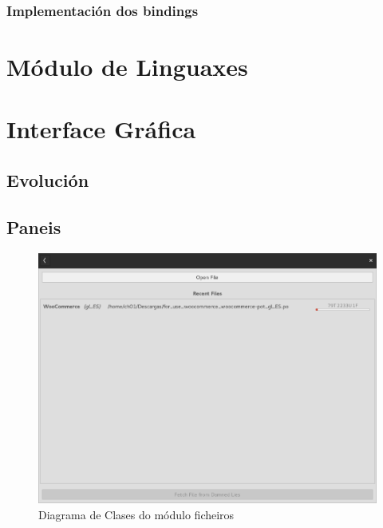 \subsubsection{Implementación dos bindings}



\section{Módulo de Linguaxes}

\section{Interface Gráfica}

\subsection{Evolución}

\subsection{Paneis}

\begin{figure}[h!]
  \centering
    \includegraphics[width=\textwidth]{img/panel_abrir_ficheiro.png}
    \caption{Diagrama de Clases do módulo ficheiros}
    \label{fig:dia_class:files}
\end{figure}

